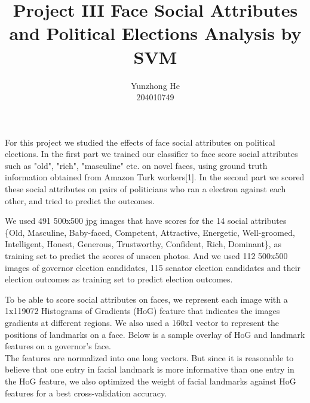 \documentclass[12pt]{article}
\newenvironment{intro}[2][I Introduction]{\begin{trivlist}
\item[\hskip \labelsep {\bfseries #1}\hskip \labelsep {\bfseries #2}]}{\end{trivlist}}
\newenvironment{p1}[2][II Dataset]{\begin{trivlist}
\item[\hskip \labelsep {\bfseries #1}\hskip \labelsep {\bfseries #2}]}{\end{trivlist}}
\newenvironment{p2}[2][III Feature Designs]{\begin{trivlist}
\item[\hskip \labelsep {\bfseries #1}\hskip \labelsep {\bfseries #2}]}{\end{trivlist}}
\begin{document}
 
 
\title{Project III Face Social Attributes and Political Elections Analysis by SVM}
\author{Yunzhong He\\ %
204010749} %
 
\maketitle

\begin{intro}{}
\item{}
For this project we studied the effects of face social attributes on political elections. In the first part we trained our classifier to face score social attributes such as "old", "rich", "masculine" etc. on novel faces, using ground truth information obtained from Amazon Turk workers[1]. In the second part we scored these social attributes on pairs of politicians who ran a electron against each other, and tried to predict the outcomes.
\end{intro}

\begin{p1}{}
\item{}
We used 491 500x500 jpg images that have scores for the 14 social attributes \{Old, Masculine, Baby-faced, Competent, Attractive, Energetic, Well-groomed, Intelligent, Honest, Generous, Trustworthy, Confident, Rich, Dominant\}, as training set to predict the scores of unseen photos. And we used 112 500x500 images of governor election candidates, 115 senator election candidates and their election outcomes as training set to predict election outcomes.
\end{p1}

\begin{p2}{}
\item{}
To be able to score social attributes on faces, we represent each image with a 1x119072 Histograms of Gradients (HoG) feature that indicates the images gradients at different regions. We also used a 160x1 vector to represent the positions of landmarks on a face. Below is a sample overlay of HoG and landmark features on a governor's face.
\\
The features are normalized into one long vectors. But since it is reasonable to believe that one entry in facial landmark is more informative than one entry in the HoG feature, we also optimized the weight of facial landmarks against HoG features for a best cross-validation accuracy.
\end{p2}
\end{document}
